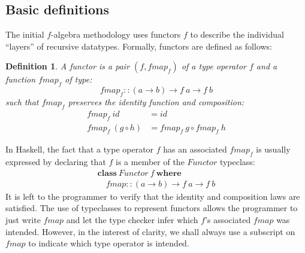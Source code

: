 \documentclass{jfp1}
\newtheorem{definition}{Definition}
\newcommand{\kw}[1]{\textbf{#1}}
\begin{document}
\subsection{Basic definitions}

The initial $f$-algebra methodology uses functors $f$ to describe the
individual ``layers'' of recursive datatypes.
Formally, functors are defined as follows:
\begin{definition}\label{defn:functor}
  A \emph{functor} is a pair $(f, \mathit{fmap}_f)$ of a type operator
  $f$ and a function $\mathit{fmap}_f$ of type:
  \begin{displaymath}
    \mathit{fmap}_f :: (a \to b) \to f~a \to f~b
  \end{displaymath}
  such that $\mathit{fmap}_f$ preserves the identity function and
  composition:
  \begin{align}
    \label{eq:fmap-id}
    \mathit{fmap}_f~\mathit{id} & = \mathit{id} \\
    \label{eq:fmap-comp}
    \mathit{fmap}_f~(g \circ h) & = \mathit{fmap}_f~g \circ \mathit{fmap}_f~h
  \end{align}
\end{definition}

In Haskell, the fact that a type operator $f$ has an associated
$\mathit{fmap}_f$ is usually expressed by declaring that $f$ is a
member of the $\mathit{Functor}$ typeclass:
\begin{displaymath}
  \begin{array}{l}
    \kw{class}~\mathit{Functor}~f~\kw{where} \\
    \quad \mathit{fmap} :: (a \to b) \to f~a \to f~b
  \end{array}
\end{displaymath}
It is left to the programmer to verify that the identity and
composition laws are satisfied.
The use of typeclasses to represent functors allows
the programmer to just write $\mathit{fmap}$ and let the type checker
infer which $f$'s associated $\mathit{fmap}$ was intended. However, in
the interest of clarity, we shall always use a subscript on
$\mathit{fmap}$ to indicate which type operator is intended.
\end{document}
